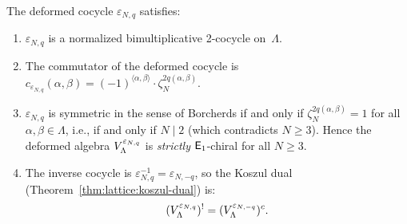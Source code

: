 \begin{proposition}
\label{prop:lattice:deformation-properties}
The deformed cocycle $\varepsilon_{N,q}$ satisfies:
\begin{enumerate}[label=(\roman*)]
\item $\varepsilon_{N,q}$ is a normalized bimultiplicative 2-cocycle
  on~$\Lambda$.
\item The commutator of the deformed cocycle is
  $c_{\varepsilon_{N,q}}(\alpha,\beta)
  = (-1)^{\langle\alpha,\beta\rangle}
    \cdot \zeta_N^{2q(\alpha,\beta)}$.
\item $\varepsilon_{N,q}$ is symmetric in the sense of Borcherds
  if and only if $\zeta_N^{2q(\alpha,\beta)} = 1$ for all
  $\alpha, \beta \in \Lambda$, i.e., if and only if $N \mid 2$
  \textup{(}which contradicts $N \geq 3$\textup{)}.  Hence the
  deformed algebra $V_\Lambda^{\varepsilon_{N,q}}$ is
  \emph{strictly} $\mathsf{E}_1$-chiral for all $N \geq 3$.
\item The inverse cocycle is
  $\varepsilon_{N,q}^{-1} = \varepsilon_{N,-q}$, so the Koszul dual
  \textup{(}Theorem~\textup{\ref{thm:lattice:koszul-dual})} is:
  \begin{equation}\label{eq:lattice:deformed-koszul-dual}
  (V_\Lambda^{\varepsilon_{N,q}})^!
  = (V_\Lambda^{\varepsilon_{N,-q}})^c.
  \end{equation}
\end{enumerate}
\end{proposition}

